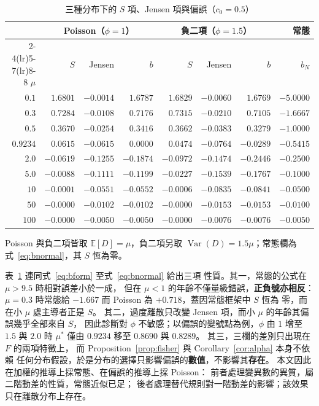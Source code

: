\documentclass[UTF8, fontset=macnew, a4paper, 12pt]{ctexart}
\newcommand{\Ex}{\mathbb{E}}
\begin{document}
\begin{table}[H]
\centering
\caption{三種分布下的 $S$ 項、Jensen 項與偏誤（$c_0=0.5$）}
\footnotesize
\begin{tabular}{rrrrrrrr}
\toprule
 & \multicolumn{3}{c}{Poisson（$\phi=1$）} & \multicolumn{3}{c}{負二項（$\phi=1.5$）} & 常態\\
\cmidrule(lr){2-4}\cmidrule(lr){5-7}\cmidrule(lr){8-8}
$\mu$ & $S$ & Jensen & $b$ & $S$ & Jensen & $b$ & $b_N$\\
\midrule
$0.1$   & $1.6801$  & $-0.0014$ & $1.6787$  & $1.6829$  & $-0.0060$ & $1.6769$  & $-5.0000$\\
$0.3$   & $0.7284$  & $-0.0108$ & $0.7176$  & $0.7315$  & $-0.0210$ & $0.7105$  & $-1.6667$\\
$0.5$   & $0.3670$  & $-0.0254$ & $0.3416$  & $0.3662$  & $-0.0383$ & $0.3279$  & $-1.0000$\\
$0.9234$& $0.0615$  & $-0.0615$ & $0.0000$  & $0.0474$  & $-0.0764$ & $-0.0289$ & $-0.5415$\\
$2.0$   & $-0.0619$ & $-0.1255$ & $-0.1874$ & $-0.0972$ & $-0.1474$ & $-0.2446$ & $-0.2500$\\
$5.0$   & $-0.0088$ & $-0.1111$ & $-0.1199$ & $-0.0227$ & $-0.1539$ & $-0.1767$ & $-0.1000$\\
$10$    & $-0.0001$ & $-0.0551$ & $-0.0552$ & $-0.0006$ & $-0.0835$ & $-0.0841$ & $-0.0500$\\
$50$    & $-0.0000$ & $-0.0102$ & $-0.0102$ & $-0.0000$ & $-0.0153$ & $-0.0153$ & $-0.0100$\\
$100$   & $-0.0000$ & $-0.0050$ & $-0.0050$ & $-0.0000$ & $-0.0076$ & $-0.0076$ & $-0.0050$\\
\bottomrule
\end{tabular}

{\footnotesize Poisson 與負二項皆取 $\Ex[D]=\mu$，負二項另取
$\operatorname{Var}(D)=1.5\mu$；常態欄為式~\eqref{eq:bnormal}，其 $S$ 恆為零。}
\label{tab:normal}
\end{table}

表~\ref{tab:normal} 連同式~\eqref{eq:bform} 至式~\eqref{eq:bnormal} 給出三項
性質。其一，常態的公式在 $\mu>9.5$ 時相對誤差小於一成，
但在 $\mu<1$ 的年齡不僅量級錯誤，\textbf{正負號亦相反}：
$\mu=0.3$ 時常態給 $-1.667$ 而 Poisson 為 $+0.718$，蓋因常態框架中 $S$ 恆為
零，而在小 $\mu$ 處主導者正是 $S$。
其二，過度離散只改變 Jensen 項，而小 $\mu$ 的年齡其偏誤幾乎全部來自 $S$，
因此診斷對 $\phi$ 不敏感；以偏誤的變號點為例，$\phi$ 由 $1$ 增至 $1.5$ 與
$2.0$ 時 $\mu^{\ast}$ 僅由 $0.9234$ 移至 $0.8690$ 與 $0.8289$。
其三，三欄的差別只出現在 $F$ 的兩項特徵上，
而 Proposition~\ref{prop:fisher} 與 Corollary~\ref{cor:alpha} 本身不依賴
任何分布假設，於是分布的選擇只影響偏誤的\textbf{數值}，不影響其\textbf{存在}。
本文因此在加權的推導上採常態、在偏誤的推導上採 Poisson：
前者處理變異數的異質，屬二階動差的性質，常態近似已足；
後者處理替代規則對一階動差的影響；該效果只在離散分布上存在。
\end{document}
